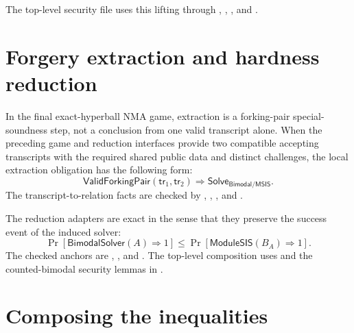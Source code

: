 The top-level security file uses this lifting through
,
,
, and
.

\section{Forgery extraction and hardness reduction}
\label{sec:paper-proof-hardness}

In the final exact-hyperball NMA game, extraction is a forking-pair
special-soundness step, not a conclusion from one valid transcript alone.  When
the preceding game and reduction interfaces provide two compatible accepting
transcripts with the required shared public data and distinct challenges, the
local extraction obligation has the following form:
\[
  \mathsf{ValidForkingPair}(\mathsf{tr}_1,\mathsf{tr}_2)
  \Longrightarrow
  \mathsf{Solve}_{\mathsf{Bimodal/MSIS}}.
\]
The transcript-to-relation facts are checked by
,
,
, and
.

The reduction adapters are exact in the sense that they preserve the success
event of the induced solver:
\[
  \Pr[\mathsf{BimodalSolver}(A)\Rightarrow 1]
  \le
  \Pr[\mathsf{ModuleSIS}(B_A)\Rightarrow 1].
\]
The checked anchors are
,
, and
.  The top-level composition uses
 and the counted-bimodal security
lemmas in .

\section{Composing the inequalities}
\label{sec:paper-proof-composition}

